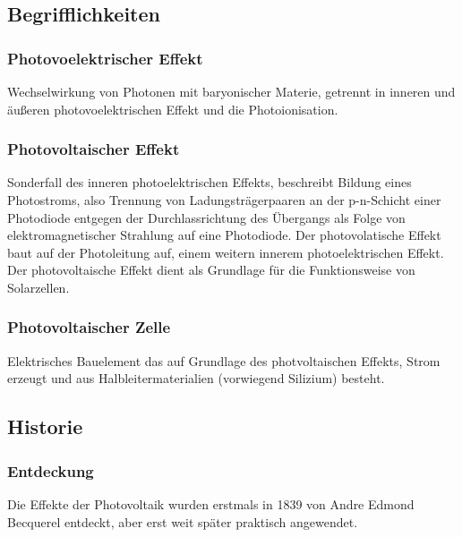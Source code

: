 \subsection{Begrifflichkeiten}
    \subsubsection{Photovoelektrischer Effekt}
        Wechselwirkung von Photonen mit baryonischer Materie, getrennt in
        inneren und äußeren photovoelektrischen Effekt und die Photoionisation.
        \cite{Wiki_PhotoelectricEffect}
    \subsubsection{Photovoltaischer Effekt}
        Sonderfall des inneren photoelektrischen Effekts, beschreibt Bildung eines
        Photostroms, also Trennung von Ladungsträgerpaaren an der p-n-Schicht
        einer Photodiode entgegen der Durchlassrichtung des Übergangs als Folge
        von elektromagnetischer Strahlung auf eine Photodiode.
        Der photovolatische Effekt baut auf der Photoleitung auf, einem weitern
        innerem photoelektrischen Effekt. \cite{Wiki_PhotoelectricEffect}
        Der photovoltaische Effekt dient als Grundlage für die Funktionsweise
        von Solarzellen.
    \subsubsection{Photovoltaischer Zelle}
        Elektrisches Bauelement das auf Grundlage des photvoltaischen Effekts,
Strom erzeugt und aus Halbleitermaterialien (vorwiegend Silizium) besteht.

\subsection{Historie}
    \subsubsection{Entdeckung}
        Die Effekte der Photovoltaik wurden erstmals in 1839 von Andre Edmond
        Becquerel entdeckt, aber erst weit später praktisch angewendet.
        \cite{Wiki_PhotovoltaicHistory}
